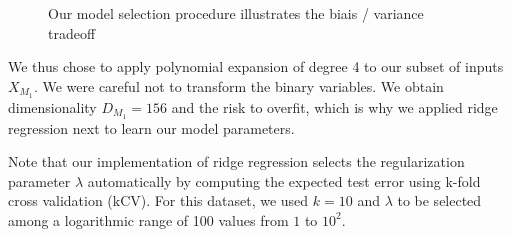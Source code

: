 \documentclass{article} %
\begin{document}
  \begin{figure}[ht]
    \center
    \hfill
    \caption{Our model selection procedure illustrates the biais / variance tradeoff}
    \label{fig:basis-expansion-test-error}
  \end{figure}

  We thus chose to apply polynomial expansion of degree 4 to our subset of inputs $X_{M_1}$. We were careful not to transform the binary variables. We obtain dimensionality $D_{M_1} = 156$ and the risk to overfit, which is why we applied ridge regression next to learn our model parameters.

  Note that our implementation of ridge regression selects the regularization parameter $\lambda$ automatically by computing the expected test error using k-fold cross validation (kCV). For this dataset, we used $k = 10$ and $\lambda$ to be selected among a logarithmic range of 100 values from $1$ to $10^2$.
\end{document}
